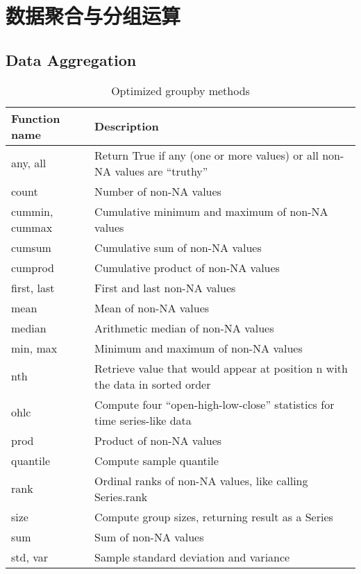 \chapter{数据聚合与分组运算\label{ch10}}
\section{Data Aggregation}
\begin{table}
    \centering
    \caption{Optimized groupby methods}
    \label{tbl10.1}
    \begin{tabular}{ll}
        \hline
        Function name  & Description                                                                  \\
        \hline
        any, all       & Return True if any (one or more values) or all non-NA values are “truthy”    \\
        count          & Number of non-NA values                                                      \\
        cummin, cummax & Cumulative minimum and maximum of non-NA values                              \\
        cumsum         & Cumulative sum of non-NA values                                              \\
        cumprod        & Cumulative product of non-NA values                                          \\
        first, last    & First and last non-NA values                                                 \\
        mean           & Mean of non-NA values                                                        \\
        median         & Arithmetic median of non-NA values                                           \\
        min, max       & Minimum and maximum of non-NA values                                         \\
        nth            & Retrieve value that would appear at position n with the data in sorted order \\
        ohlc           & Compute four “open-high-low-close” statistics for time series-like data      \\
        prod           & Product of non-NA values                                                     \\
        quantile       & Compute sample quantile                                                      \\
        rank           & Ordinal ranks of non-NA values, like calling Series.rank                     \\
        size           & Compute group sizes, returning result as a Series                            \\
        sum            & Sum of non-NA values                                                         \\
        std, var       & Sample standard deviation and variance                                       \\
        \hline
    \end{tabular}
\end{table}
